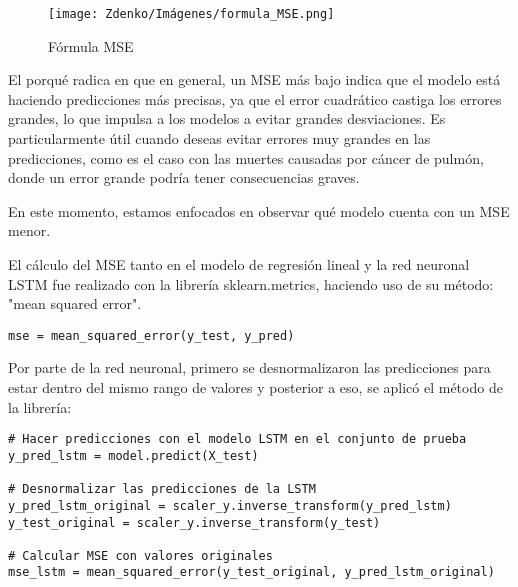 \begin{figure}[H] 
    \centering 
    \texttt{[image: Zdenko/Imágenes/formula\_MSE.png]} 
    \caption{Fórmula MSE} 
    \label{fig:formula} 
\end{figure}


El porqué radica en que en general, un MSE más bajo indica que el modelo está haciendo predicciones más precisas, ya que el error cuadrático castiga los errores grandes, lo que impulsa a los modelos a evitar grandes desviaciones. Es particularmente útil cuando deseas evitar errores muy grandes en las predicciones, como es el caso con las muertes causadas por cáncer de pulmón, donde un error grande podría tener consecuencias graves.

En este momento, estamos enfocados en observar qué modelo cuenta con un MSE menor. 

El cálculo del MSE tanto en el modelo de regresión lineal y la red neuronal LSTM fue realizado con la librería sklearn.metrics, haciendo uso de su método: "mean squared error".


\begin{lstlisting}
mse = mean_squared_error(y_test, y_pred)
\end{lstlisting}

\newpage

Por parte de la red neuronal, primero se desnormalizaron las predicciones para estar dentro del mismo rango de valores y posterior a eso, se aplicó el método de la librería: 


\begin{lstlisting}
# Hacer predicciones con el modelo LSTM en el conjunto de prueba
y_pred_lstm = model.predict(X_test)

# Desnormalizar las predicciones de la LSTM
y_pred_lstm_original = scaler_y.inverse_transform(y_pred_lstm)
y_test_original = scaler_y.inverse_transform(y_test)

# Calcular MSE con valores originales
mse_lstm = mean_squared_error(y_test_original, y_pred_lstm_original)
\end{lstlisting}

